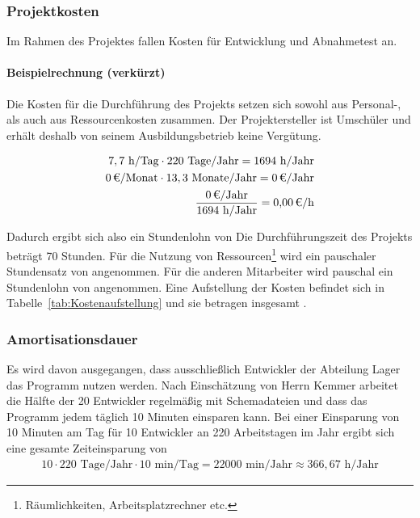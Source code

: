 \subsubsection{Projektkosten}
\label{sec:Projektkosten}
Im Rahmen des Projektes fallen Kosten für Entwicklung und Abnahmetest an.

\paragraph{Beispielrechnung (verkürzt)}
Die Kosten für die Durchführung des Projekts setzen sich sowohl aus Personal-, als auch aus Ressourcenkosten zusammen.
Der Projektersteller ist Umschüler und erhält deshalb von seinem Ausbildungsbetrieb keine Vergütung.

\begin{eqnarray}
7,7 \mbox{ h/Tag} \cdot 220 \mbox{ Tage/Jahr} = 1694 \mbox{ h/Jahr}\\
\eur{0}\mbox{/Monat} \cdot 13,3 \mbox{ Monate/Jahr} = \eur{0} \mbox{/Jahr}\\
\frac{\eur{0} \mbox{/Jahr}}{1694 \mbox{ h/Jahr}} = \eur{0,00}\mbox{/h}
\end{eqnarray}

Dadurch ergibt sich also ein Stundenlohn von 
Die Durchführungszeit des Projekts beträgt 70 Stunden. Für die Nutzung von Ressourcen\footnote{Räumlichkeiten, Arbeitsplatzrechner etc.} wird 
ein pauschaler Stundensatz von  angenommen. Für die anderen Mitarbeiter wird pauschal ein Stundenlohn von  angenommen. 
Eine Aufstellung der Kosten befindet sich in Tabelle~\ref{tab:Kostenaufstellung} und sie betragen insgesamt .


\subsubsection{Amortisationsdauer}
\label{sec:Amortisationsdauer}
Es wird davon ausgegangen, dass ausschließlich Entwickler der Abteilung Lager das Programm nutzen werden. Nach Einschätzung von Herrn Kemmer arbeitet die Hälfte der 20 Entwickler regelmäßig mit Schemadateien und dass das Programm jedem täglich 10 Minuten einsparen kann.
Bei einer Einsparung von 10 Minuten am Tag für 10 Entwickler an 220 Arbeitstagen im Jahr ergibt sich eine gesamte Zeiteinsparung von 
\begin{eqnarray}
10 \cdot 220 \mbox{ Tage/Jahr} \cdot 10 \mbox{ min/Tag} = 22000 \mbox{ min/Jahr} \approx 366,67 \mbox{ h/Jahr} 
\end{eqnarray}

